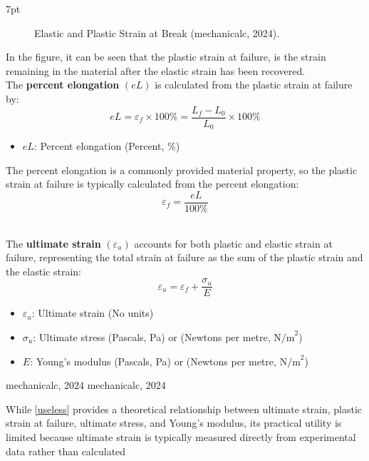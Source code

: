 \documentclass{article}
\newcommand{\formalsource}{} %
\newenvironment{formal}[1][]{%
    \renewcommand{\formalsource}{#1}%
    \def\FrameCommand{%
        \hspace{1pt}%
        {\color{gray}\vrule width 2pt}%
        {\color{white}\vrule width 4pt}%
        \colorbox{white}%
    }%
    \MakeFramed{\advance\hsize-\width\FrameRestore}%
    \noindent\hspace{-4.55pt}%
    \begin{adjustwidth}{}{7pt}%
        \vspace{2pt}%
    }%
    {%
        \vspace{4pt}%
        \ifx\formalsource\empty %
        \else
        \hfill{\footnotesize{\formalsource}}%
        \fi
    \end{adjustwidth}\endMakeFramed%
}
\begin{document}
{\begin{formal}[mechanicalc, 2024]
\begin{minipage}{0.45\textwidth}
\begin{figure}[H]
    \caption{Elastic and Plastic Strain at Break (mechanicalc, 2024).}
    \label{fig:strain-break}
\end{figure}
\end{minipage}\hfill
\begin{minipage}{0.49\textwidth}
In the figure, it can be seen that the plastic strain at failure, is the strain remaining in the material after the elastic strain has been recovered.\\[8pt]
The \textbf{percent elongation} \((eL)\) is calculated from the plastic strain at failure by:
\begin{equation}
    eL = \varepsilon_f \times 100\% = \frac{L_f - L_0}{L_0} \times 100\%
    \label{el}
\end{equation}
\begin{itemize}[itemsep=-1mm]
    \item $eL$: Percent elongation (Percent, \%)
\end{itemize}
The percent elongation is a commonly provided material property, so the plastic strain at failure is typically calculated from the percent elongation:
\begin{equation}
    \varepsilon_f = \frac{eL}{100\%}
\end{equation}
\end{minipage}\\[8pt]
The \textbf{ultimate strain} $(\varepsilon_u)$ accounts for both plastic and elastic strain at failure, representing the total strain at failure as the sum of the plastic strain and the elastic strain:
\begin{equation}
    \varepsilon_u = \varepsilon_f + \frac{\sigma_{u}}{E}
    \label{useless}
\end{equation}
\begin{itemize}[itemsep=-1mm]
    \item $\varepsilon_u$: Ultimate strain (No units)
    \item $\sigma_{u}$: Ultimate stress (Pascals, Pa) or (Newtons per metre, \(\text{N/m}^2\))
    \item $E$: Young's modulus (Pascals, Pa) or (Newtons per metre, \(\text{N/m}^2\))
\end{itemize} 
\end{formal}
\newpage
While \ref{useless} provides a theoretical relationship between ultimate strain, plastic strain at failure, ultimate stress, and Young's modulus, its practical utility is limited because ultimate strain is typically measured directly from experimental data rather than calculated\\[8pt]
}
\end{document}

